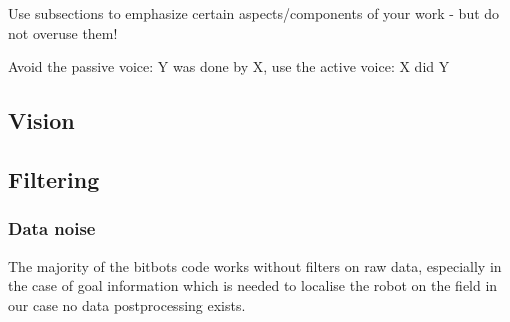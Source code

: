 \documentclass[lnicst,a4paper]{svmultln}
\begin{document}
Use subsections to emphasize certain aspects/components of
your work -
but do not overuse them!

Avoid the passive voice: Y was done by X, use the active voice: X did Y





\subsection{Vision}





\subsection{Filtering}

\subsubsection{Data noise}
The majority of the bitbots code works without filters on raw data,
especially in the case of goal information which is needed to localise
the robot on the field in our case no data postprocessing exists.
\end{document}
